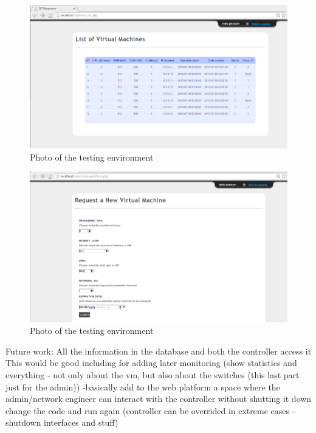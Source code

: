 \documentclass[12pt,english,oneside]{book}
\begin{document}
\begin{figure}[htbp]
        \centering
        \includegraphics[width=1\textwidth]{figures/webplat_vmlist.png}
        \caption{Photo of the testing environment}
        \label{fig:realenv}
\end{figure}

\begin{figure}[htbp]
        \centering
        \includegraphics[width=1\textwidth]{figures/webplat_vmreq.png}
        \caption{Photo of the testing environment}
        \label{fig:realenv}
\end{figure}

Future work:
All the information in the database and both the controller access it
This would be good including for adding later monitoring (show statistics and everything - not only about the vm, but also about the switches (this last part just for the admin))
-basically add to the web platform a space where the admin/network engineer can interact with the controller without shutting it down change the code and run again (controller can be overrided in extreme cases - shutdown interfaces and stuff)
\end{document}
